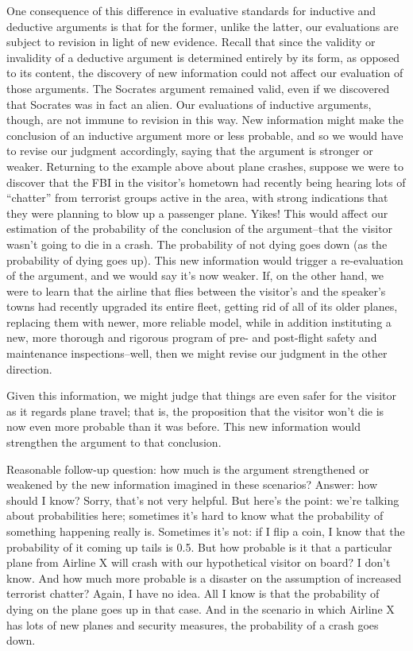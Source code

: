 One consequence of this difference in evaluative standards for inductive and deductive arguments
is that for the former, unlike the latter, our evaluations are subject to revision in light of new
evidence. Recall that since the validity or invalidity of a deductive argument is determined entirely
by its form, as opposed to its content, the discovery of new information could not affect our
evaluation of those arguments. The Socrates argument remained valid, even if we discovered that
Socrates was in fact an alien. Our evaluations of inductive arguments, though, are not immune to
revision in this way. New information might make the conclusion of an inductive argument more
or less probable, and so we would have to revise our judgment accordingly, saying that the
argument is stronger or weaker. Returning to the example above about plane crashes, suppose we
were to discover that the FBI in the visitor's hometown had recently being hearing lots of ``chatter''
from terrorist groups active in the area, with strong indications that they were planning to blow up
a passenger plane. Yikes! This would affect our estimation of the probability of the conclusion of
the argument--that the visitor wasn't going to die in a crash. The probability of not dying goes
down (as the probability of dying goes up). This new information would trigger a re-evaluation of
the argument, and we would say it's now weaker. If, on the other hand, we were to learn that the
airline that flies between the visitor's and the speaker's towns had recently upgraded its entire
fleet, getting rid of all of its older planes, replacing them with newer, more reliable model, while
in addition instituting a new, more thorough and rigorous program of pre- and post-flight safety
and maintenance inspections--well, then we might revise our judgment in the other direction.

Given this information, we might judge that things are even safer for the visitor as it regards plane
travel; that is, the proposition that the visitor won't die is now even more probable than it was
before. This new information would strengthen the argument to that conclusion.

Reasonable follow-up question: how much is the argument strengthened or weakened by the new
information imagined in these scenarios? Answer: how should I know? Sorry, that's not very
helpful. But here's the point: we're talking about probabilities here; sometimes it's hard to know
what the probability of something happening really is. Sometimes it's not: if I flip a coin, I know
that the probability of it coming up tails is 0.5. But how probable is it that a particular plane from
Airline X will crash with our hypothetical visitor on board? I don't know. And how much more
probable is a disaster on the assumption of increased terrorist chatter? Again, I have no idea. All I
know is that the probability of dying on the plane goes up in that case. And in the scenario in which
Airline X has lots of new planes and security measures, the probability of a crash goes down.

